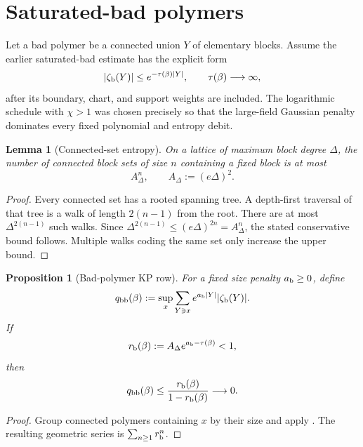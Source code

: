 \documentclass[11pt,oneside]{book}
\newtheorem{lemma}[theorem]{Lemma}
\newtheorem{proposition}[theorem]{Proposition}
\theoremstyle{definition}
\theoremstyle{remark}
\begin{document}
\section{Saturated-bad polymers}
\label{sec:e8v8-bad}

Let a bad polymer be a connected union \(Y\) of elementary blocks.
Assume the earlier saturated-bad estimate has the explicit form
\[
 |\zeta_{\rm b}(Y)|
 \le e^{-\tau(\beta)|Y|},\qquad
 \tau(\beta)\longrightarrow\infty,                  \label{eq:e8v8-bad-activity}
\]
after its boundary, chart, and support weights are included.  The
logarithmic schedule with \(\chi>1\) was chosen precisely so that the
large-field Gaussian penalty dominates every fixed polynomial and
entropy debit.

\begin{lemma}[Connected-set entropy]
\label{lem:e8v8-lattice-animals}
On a lattice of maximum block degree \(\Delta\), the number of
connected block sets of size \(n\) containing a fixed block is at
most
\[
 A_\Delta^n,\qquad A_\Delta:=(e\Delta)^2.            \label{eq:e8v8-animal}
\]
\end{lemma}

\begin{proof}
Every connected set has a rooted spanning tree.  A depth-first
traversal of that tree is a walk of length \(2(n-1)\) from the root.
There are at most \(\Delta^{2(n-1)}\) such walks.  Since
\(\Delta^{2(n-1)}\le(e\Delta)^{2n}=A_\Delta^n\), the stated
conservative bound follows.  Multiple walks coding the same set only
increase the upper bound.
\end{proof}

\begin{proposition}[Bad-polymer KP row]
\label{prop:e8v8-bad-row}
For a fixed size penalty \(a_{\rm b}\ge0\), define
\[
 q_{\rm bb}(\beta):=
 \sup_x\sum_{Y\ni x}e^{a_{\rm b}|Y|}
 |\zeta_{\rm b}(Y)|.                                \label{eq:e8v8-qbb}
\]
If
\[
 r_{\rm b}(\beta):=
 A_\Delta e^{a_{\rm b}-\tau(\beta)}<1,              \label{eq:e8v8-rb}
\]
then
\[
 q_{\rm bb}(\beta)
 \le\frac{r_{\rm b}(\beta)}{1-r_{\rm b}(\beta)}
 \longrightarrow0.                                 \label{eq:e8v8-qbb-bound}
\]
\end{proposition}

\begin{proof}
Group connected polymers containing \(x\) by their size and apply
.  The resulting
geometric series is
\(\sum_{n\ge1}r_{\rm b}^n\).
\end{proof}
\end{document}

